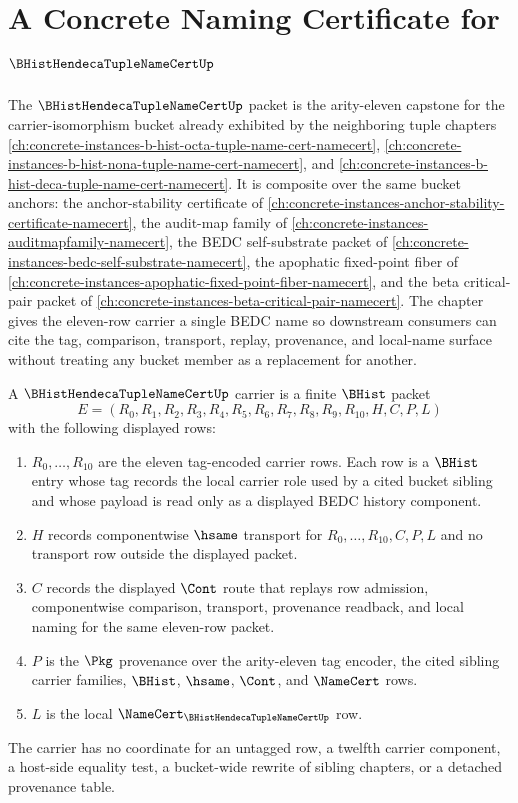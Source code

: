 \chapter{A Concrete Naming Certificate for $\BHistHendecaTupleNameCertUp$}
\label{ch:concrete-instances-b-hist-hendeca-tuple-namecert}

The $\BHistHendecaTupleNameCertUp$ packet is the arity-eleven capstone for the carrier-isomorphism bucket already exhibited by the neighboring tuple chapters \autoref{ch:concrete-instances-b-hist-octa-tuple-name-cert-namecert}, \autoref{ch:concrete-instances-b-hist-nona-tuple-name-cert-namecert}, and \autoref{ch:concrete-instances-b-hist-deca-tuple-name-cert-namecert}. It is composite over the same bucket anchors: the anchor-stability certificate of \autoref{ch:concrete-instances-anchor-stability-certificate-namecert}, the audit-map family of \autoref{ch:concrete-instances-auditmapfamily-namecert}, the BEDC self-substrate packet of \autoref{ch:concrete-instances-bedc-self-substrate-namecert}, the apophatic fixed-point fiber of \autoref{ch:concrete-instances-apophatic-fixed-point-fiber-namecert}, and the beta critical-pair packet of \autoref{ch:concrete-instances-beta-critical-pair-namecert}. The chapter gives the eleven-row carrier a single BEDC name so downstream consumers can cite the tag, comparison, transport, replay, provenance, and local-name surface without treating any bucket member as a replacement for another.

\begin{definition}
\label{def:b-hist-hendeca-tuple-name-cert-carrier}
A $\BHistHendecaTupleNameCertUp$ carrier is a finite $\BHist$ packet
$$
E=(R_0,R_1,R_2,R_3,R_4,R_5,R_6,R_7,R_8,R_9,R_{10},H,C,P,L)
$$
with the following displayed rows:
\begin{enumerate}
\item $R_0,\ldots,R_{10}$ are the eleven tag-encoded carrier rows. Each row is a $\BHist$ entry whose tag records the local carrier role used by a cited bucket sibling and whose payload is read only as a displayed BEDC history component.
\item $H$ records componentwise $\hsame$ transport for $R_0,\ldots,R_{10},C,P,L$ and no transport row outside the displayed packet.
\item $C$ records the displayed $\Cont$ route that replays row admission, componentwise comparison, transport, provenance readback, and local naming for the same eleven-row packet.
\item $P$ is the $\Pkg$ provenance over the arity-eleven tag encoder, the cited sibling carrier families, $\BHist$, $\hsame$, $\Cont$, and $\NameCert$ rows.
\item $L$ is the local $\NameCert_{\BHistHendecaTupleNameCertUp}$ row.
\end{enumerate}
The carrier has no coordinate for an untagged row, a twelfth carrier component, a host-side equality test, a bucket-wide rewrite of sibling chapters, or a detached provenance table.
\end{definition}

